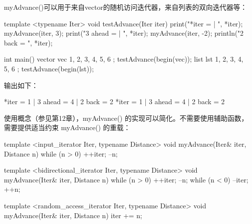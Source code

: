 myAdvance()可以用于来自vector的随机访问迭代器，来自列表的双向迭代器等：

\begin{cpp}
template <typename Iter>
void testAdvance(Iter iter)
{
    print("*iter = {} | ", *iter);
    myAdvance(iter, 3); print("3 ahead = {} | ", *iter);
    myAdvance(iter, -2); println("2 back = {}", *iter);
}

int main()
{
    vector vec { 1, 2, 3, 4, 5, 6 }; testAdvance(begin(vec));
    list lst { 1, 2, 3, 4, 5, 6 }; testAdvance(begin(lst));
}
\end{cpp}

输出如下：

\begin{shell}
*iter = 1 | 3 ahead = 4 | 2 back = 2
*iter = 1 | 3 ahead = 4 | 2 back = 2
\end{shell}

使用概念（参见第12章），myAdvance() 的实现可以简化。不需要使用辅助函数，需要提供适当约束 myAdvance() 的重载：

\begin{cpp}
template <input_iterator Iter, typename Distance>
void myAdvance(Iter& iter, Distance n)
{
    while (n > 0) { ++iter; --n; }
}

template <bidirectional_iterator Iter, typename Distance>
void myAdvance(Iter& iter, Distance n)
{
    while (n > 0) { ++iter; --n; }
    while (n < 0) { --iter; ++n; }
}

template <random_access_iterator Iter, typename Distance>
void myAdvance(Iter& iter, Distance n)
{
    iter += n;
}
\end{cpp}









